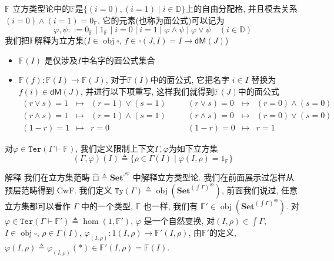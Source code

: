 \documentclass[aspectratio=169,xcolor=dvipsnames]{beamer}
\newcommand\bbD{\mathbb{D}}
\newcommand\bbF{\mathbb{F}}
\newcommand\Ty{\mathtt{Ty}}
\newcommand\Ter{\mathtt{Ter}}
\newcommand\dM{\mathsf{dM}}
\newcommand\Set{\mathbf{Set}}
\DeclareMathOperator\obj{obj}
\begin{document}
\begin{frame}[shrink]{$\bbF$}
  立方类型论中的$\bbF$是$\{(i=0),(i=1)\mid i\in\bbD\}$上的自由分配格, 并且模去关系$(i=0)\land(i=1)=0_{\bbF}$. 它的元素(也称为面公式)可以记为
  \[
  \varphi,\psi ::= 0_{\bbF} \mid 1_{\bbF} \mid i=0 \mid i=1 \mid \varphi\land\psi \mid \varphi\lor\psi \quad(i\in\bbD)
  \]
  我们把$\bbF$解释为立方集($I\in\obj\square$, $f\in\square(J,I)=I\to\dM(J)$)
  \begin{itemize}
    \item $\bbF(I)$ 是仅涉及$I$中名字的面公式集合
    \item $\bbF(f):\bbF(I)\to\bbF(J)$, 对于$\bbF(I)$中的面公式, 它把名字 $i\in I$ 替换为 $f(i)\in\dM(J)$, 并进行以下项重写, 这样我们就得到$\bbF(J)$中的面公式
\[
\begin{array}{rclcrcl}
(r \lor s) = 1 & \mapsto & (r=1) \lor (s=1) & \quad & (r \lor s) = 0 & \mapsto & (r=0) \land (s=0) \\
(r \land s) = 1 & \mapsto & (r=1) \land (s=1) & \quad & (r \land s) = 0 & \mapsto & (r=0) \lor (s=0) \\
(1-r) = 1 & \mapsto & r=0 & \quad & (1-r) = 0 & \mapsto & r=1
\end{array}
\]
  \end{itemize}
  对$\varphi\in\Ter(\Gamma\vdash\bbF)$, 我们定义限制上下文$\Gamma,\varphi$为如下立方集
  \[
  (\Gamma,\varphi)(I)\triangleq\{\rho\in\Gamma(I)\mid\varphi(I,\rho)=1_{\bbF}\}
  \]
\end{frame}

\begin{frame}[shrink]{解释}
  我们在立方集范畴 $\widehat{□}\triangleq\Set^{\square^{op}}$ 中解释立方类型论. 我们在前面展示过怎样从预层范畴得到 CwF. 我们定义 $\Ty(\Gamma)\triangleq\obj(\Set^{{(\int\Gamma)}^{op}})$, 前面我们说过, 任意立方集都可以看作 $\Gamma$ 中的一个类型, $\bbF$ 也一样, 我们有 $\bbF'\in\obj(\Set^{{(\int\Gamma)}^{op}})$. 对$\varphi\in\Ter(\Gamma\vdash\bbF')\triangleq\hom(1,\bbF')$, $\varphi$ 是一个自然变换, 对$(I,\rho)\in\int\Gamma$, $I\in\obj\square$, $\rho\in\Gamma(I)$, $\varphi_{(I,\rho)}:1(I,\rho)\to\bbF'(I,\rho)$, 由$\bbF'$的定义, $\varphi(I,\rho)\triangleq\varphi_{(I,\rho)}(\ast) \in \bbF'(I,\rho)=\bbF(I)$.
\end{frame}
\end{document}

